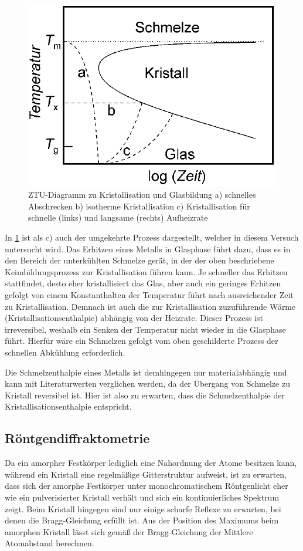 \documentclass[
	a4paper,
	12pt,
	pagesize,
	ngerman
]{scrartcl}
\begin{document}
	\begin{figure}[H]
			\includegraphics[width= 0.7 \linewidth]{img/kristallisierung}
			\caption{
			ZTU-Diagramm zu Kristallisation und Glasbildung
			a) schnelles Abschrecken
			b) isotherme Kristallisation
			c) Kristallisation für schnelle (links) und langsame (rechts) Aufheizrate
			\cite{anleitung}
			}
			\label{fig_kristallisierung}
	\end{figure}

	In \cref{fig_kristallisierung} ist als c) auch der umgekehrte Prozess dargestellt, welcher in diesem Versuch untersucht wird.
	Das Erhitzen eines Metalls in Glasphase führt dazu, dass es in den Bereich der unterkühlten Schmelze gerät, in der der oben beschriebene Keimbildungsprozess zur Kristallisation führen kann.
	Je schneller das Erhitzen stattfindet, desto eher kristallisiert das Glas, aber auch ein geringes Erhitzen gefolgt von einem Konstanthalten der Temperatur führt nach ausreichender Zeit zu Kristallisation.
	Demnach ist auch die zur Kristallisation zuzuführende Wärme (Kristallisationsenthalpie) abhängig von der Heizrate.
	Dieser Prozess ist irreversibel, weshalb ein Senken der Temperatur nicht wieder in die Glasphase führt.
	Hierfür wäre ein Schmelzen gefolgt vom oben geschilderte Prozess der schnellen Abkühlung erforderlich.

	Die Schmelzenthalpie eines Metalls ist demhingegen nur materialabhängig und kann mit Literaturwerten verglichen werden, da der Übergang von Schmelze zu Kristall reversibel ist.
	Hier ist also zu erwarten, dass die Schmelzenthalpie der Kristallisationsenthalpie entspricht. %

	\subsection{Röntgendiffraktometrie}
	Da ein amorpher Festkörper lediglich eine Nahordnung der Atome besitzen kann, während ein Kristall eine regelmäßige Gitterstruktur aufweist, ist zu erwarten, dass sich der amorphe Festkörper unter monochromatischem Röntgenlicht eher wie ein pulverisierter Kristall verhält und sich ein kontinuierliches Spektrum zeigt.
	Beim Kristall hingegen sind nur einige scharfe Reflexe zu erwarten, bei denen die Bragg-Gleichung erfüllt ist. %
	Aus der Position des Maximums beim amorphen Kristall lässt sich gemäß der Bragg-Gleichung der Mittlere Atomabstand berechnen.
\end{document}
